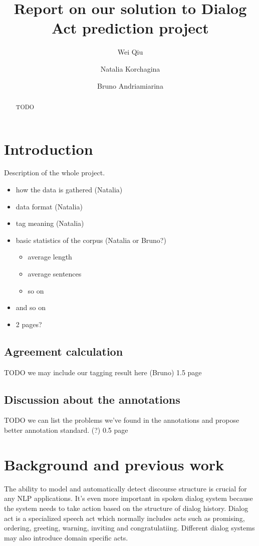 \documentclass[a4paper]{article}
\title{Report on our solution to Dialog Act prediction project}
\author{Wei Qiu \and Natalia Korchagina \and Bruno Andriamiarina}
\date{}
\begin{document}
\maketitle
\begin{abstract}
TODO
\end{abstract}
\section{Introduction}
Description of the whole project.
\begin{itemize}
\item how the data is gathered (Natalia)
\item data format (Natalia)
\item tag meaning (Natalia)
\item basic statistics of the corpus (Natalia or Bruno?)
    \begin{itemize}
        \item average length 
        \item average sentences
        \item so on
    \end{itemize}
\item and so on
\item 2 pages?
\end{itemize}
\subsection{Agreement calculation}
TODO we may include our tagging result here (Bruno)
1.5 page
\subsection{Discussion about the annotations}
TODO we can list the problems we've found in the annotations and propose better annotation standard. (?)
0.5 page
\section{Background and previous work}
The ability to model and automatically detect discourse structure is crucial for any NLP applications. It's even more important in spoken dialog system because the system needs to take action based on the structure of dialog history.
Dialog act is a specialized speech act which normally includes acts such as promising, ordering, greeting, warning, inviting and congratulatiing. Different dialog systems may also introduce domain specific acts. 
\end{document}
